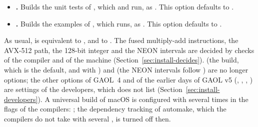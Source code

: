 \documentclass[12pt,a4paper,twoside,openright]{book}
\begin{document}
\begin{itemize}
  too, whose soname is , as CMake
  () and meson name it (it was
  , and it was built by default before GAOL v5);
   (the default) compiles the code as
  position-independent code.\newinvfive
\item[$\bullet$] \textbf{.} Builds the unit
  tests of , which  and  run, as
  . This option defaults to .
\item[$\bullet$] \textbf{.} Builds the
  examples of , which  runs, as
  . This option defaults to .
\end{itemize}

\noindent
As usual,  is equivalent to
, and  to
. The fused multiply-add instructions, the
AVX-512 path, the 128-bit integer and the NEON intervals are decided by checks
of the compiler and of the machine (Section~\ref{sec:install-decides}).
 (the  build, which is the default,
and  with ) and 
(the NEON intervals follow ) are no longer options; the
other options of GAOL~4 and of the earlier days of GAOL v5
(, ,
, ) are settings of
the developers, which  does not list
(Section~\ref{sec:install-developers}).\newinvfive{} A universal build of
macOS is configured with  several times in the flags of the
compilers: ;
the dependency tracking of automake, which the compilers do not take with
several , is turned off then.\newinvfive
\end{document}
